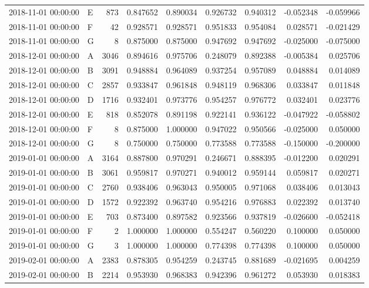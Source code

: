 \begin{tabular}{llrrrrrrr}
2018-11-01 00:00:00 & E & 873 & 0.847652 & 0.890034 & 0.926732 & 0.940312 & -0.052348 & -0.059966 \\
2018-11-01 00:00:00 & F & 42 & 0.928571 & 0.928571 & 0.951833 & 0.954084 & 0.028571 & -0.021429 \\
2018-11-01 00:00:00 & G & 8 & 0.875000 & 0.875000 & 0.947692 & 0.947692 & -0.025000 & -0.075000 \\
2018-12-01 00:00:00 & A & 3046 & 0.894616 & 0.975706 & 0.248079 & 0.892388 & -0.005384 & 0.025706 \\
2018-12-01 00:00:00 & B & 3091 & 0.948884 & 0.964089 & 0.937254 & 0.957089 & 0.048884 & 0.014089 \\
2018-12-01 00:00:00 & C & 2857 & 0.933847 & 0.961848 & 0.948119 & 0.968306 & 0.033847 & 0.011848 \\
2018-12-01 00:00:00 & D & 1716 & 0.932401 & 0.973776 & 0.954257 & 0.976772 & 0.032401 & 0.023776 \\
2018-12-01 00:00:00 & E & 818 & 0.852078 & 0.891198 & 0.922141 & 0.936122 & -0.047922 & -0.058802 \\
2018-12-01 00:00:00 & F & 8 & 0.875000 & 1.000000 & 0.947022 & 0.950566 & -0.025000 & 0.050000 \\
2018-12-01 00:00:00 & G & 8 & 0.750000 & 0.750000 & 0.773588 & 0.773588 & -0.150000 & -0.200000 \\
2019-01-01 00:00:00 & A & 3164 & 0.887800 & 0.970291 & 0.246671 & 0.888395 & -0.012200 & 0.020291 \\
2019-01-01 00:00:00 & B & 3061 & 0.959817 & 0.970271 & 0.940012 & 0.959144 & 0.059817 & 0.020271 \\
2019-01-01 00:00:00 & C & 2760 & 0.938406 & 0.963043 & 0.950005 & 0.971068 & 0.038406 & 0.013043 \\
2019-01-01 00:00:00 & D & 1572 & 0.922392 & 0.963740 & 0.954216 & 0.976883 & 0.022392 & 0.013740 \\
2019-01-01 00:00:00 & E & 703 & 0.873400 & 0.897582 & 0.923566 & 0.937819 & -0.026600 & -0.052418 \\
2019-01-01 00:00:00 & F & 2 & 1.000000 & 1.000000 & 0.554247 & 0.560220 & 0.100000 & 0.050000 \\
2019-01-01 00:00:00 & G & 3 & 1.000000 & 1.000000 & 0.774398 & 0.774398 & 0.100000 & 0.050000 \\
2019-02-01 00:00:00 & A & 2383 & 0.878305 & 0.954259 & 0.243745 & 0.881689 & -0.021695 & 0.004259 \\
2019-02-01 00:00:00 & B & 2214 & 0.953930 & 0.968383 & 0.942396 & 0.961272 & 0.053930 & 0.018383 \\

\end{tabular}
